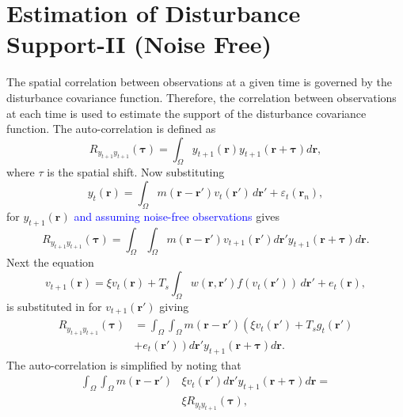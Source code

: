 \documentclass[]{article}
\newcommand{\parham}[1]{\textcolor{blue}{#1}}
\begin{document}
\section*{Estimation of Disturbance Support-II (Noise Free)}
The spatial correlation between observations at a given time is governed by the disturbance covariance function. Therefore, the correlation between observations at each time is used to estimate the support of the disturbance covariance function. The auto-correlation is defined as
\begin{equation}
	R_{y_{t+1}y_{t+1}}(\boldsymbol{\tau}) = \int_{\Omega} y_{t+1}(\mathbf{r}) y_{t+1}(\mathbf{r}+\boldsymbol{\tau}) d\mathbf{r},
\end{equation}
where $\tau$ is the spatial shift. Now substituting 
\begin{equation}\label{eq:ObservationEquation}
	y_t(\mathbf{r}) = \int_{\Omega} { m\left(\mathbf{r}-\mathbf{r}'\right) v_t\left(\mathbf{r}'\right) \, d\mathbf{r}'} + \varepsilon_t(\mathbf{r}_n), 
\end{equation}
for  $y_{t+1}(\mathbf{r})$ \parham{and assuming noise-free observations} gives 
\begin{equation}
	R_{y_{t+1}y_{t+1}}(\boldsymbol{\tau}) = \int_{\Omega}\int_{\Omega} m(\mathbf{r}-\mathbf{r}')v_{t+1}(\mathbf{r}')d\mathbf{r}' y_{t+1}(\mathbf{r}+\boldsymbol{\tau}) d\mathbf{r}.
\end{equation}
Next the equation
\begin{equation}
	\label{eq:DiscreteTimeModel} 
	v_{t+1}\left(\mathbf{r}\right) = 
	\xi v_t\left(\mathbf{r}\right) + 
	T_s \int_\Omega { 
	    w\left(\mathbf{r},\mathbf{r}'\right)
	    f\left(v_t\left(\mathbf{r}'\right)\right) 
	\, d\mathbf{r}'} 
	+ e_t\left(\mathbf{r}\right), 
\end{equation}
is substituted in for  $v_{t+1}(\mathbf{r}')$ giving 
\begin{align}
	R_{y_{t+1}y_{t+1}}(\boldsymbol{\tau}) &= \int_{\Omega}\int_{\Omega} m(\mathbf{r}-\mathbf{r}')\left(\xi v_t(\mathbf{r}') +  T_s g_t(\mathbf{r}')\right. \nonumber \\
	&+ \left. e_t(\mathbf{r}')\right) d\mathbf{r}' y_{t+1}(\mathbf{r}+\boldsymbol{\tau}) d\mathbf{r}. 
\end{align}
The auto-correlation is simplified by noting that
\begin{align}
	\int_{\Omega}\int_{\Omega} m(\mathbf{r}-\mathbf{r}')&\xi v_t(\mathbf{r}')d\mathbf{r}'y_{t+1}(\mathbf{r}+\boldsymbol{\tau}) d\mathbf{r} = \nonumber \\ 
 &\xi R_{y_ty_{t+1}}(\boldsymbol{\tau}),
\end{align}
\end{document}
